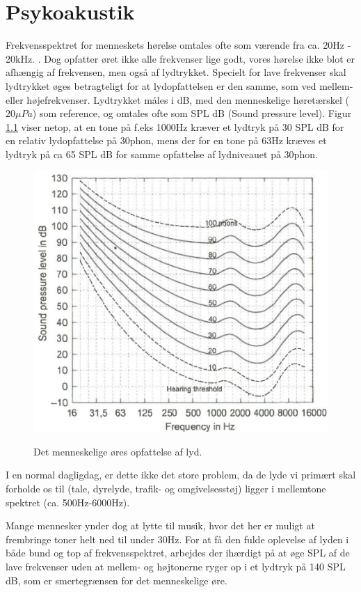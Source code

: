 \chapter{Psykoakustik}

Frekvensspektret for menneskets hørelse omtales ofte som værende fra ca. 20Hz - 20kHz. \cite{Elektroakustik}. Dog opfatter øret ikke alle frekvenser lige godt, vores hørelse ikke blot er afhængig af frekvensen, men også af lydtrykket. Specielt for lave frekvenser skal lydtrykket øges betragteligt for at lydopfattelsen er den samme, som ved mellem- eller højefrekvenser. Lydtrykket måles i dB, med den menneskelige høretærskel ($20\mu Pa$)  som reference, og omtales ofte som SPL dB (Sound pressure level). Figur \ref{fig:SPL} viser netop, at en tone på f.eks 1000Hz kræver et lydtryk på 30 SPL dB for en relativ lydopfattelse på 30phon, mens der for en tone på 63Hz kræves et lydtryk på ca 65 SPL dB for samme opfattelse af lydniveauet på 30phon.

\begin{figure}[h!]
	\centering
	\includegraphics[width=.6\textwidth]{Pics/SPL.PNG}
	\label{fig:SPL}
	\caption{Det menneskelige øres opfattelse af lyd. \cite{Elektroakustik}}
\end{figure}

I en normal dagligdag, er dette ikke det store problem, da de lyde vi primært skal forholde os til (tale, dyrelyde, trafik- og omgivelsesstøj) ligger i mellemtone spektret (ca. 500Hz-6000Hz). 

Mange mennesker ynder dog at lytte til musik, hvor det her er muligt at frembringe toner helt ned til under 30Hz. For at få den fulde oplevelse af lyden i både bund og top af frekvensspektret, arbejdes der ihærdigt på at øge SPL af de lave frekvenser uden at mellem- og højtonerne ryger op i et lydtryk på 140 SPL dB, som er smertegrænsen for det menneskelige øre.